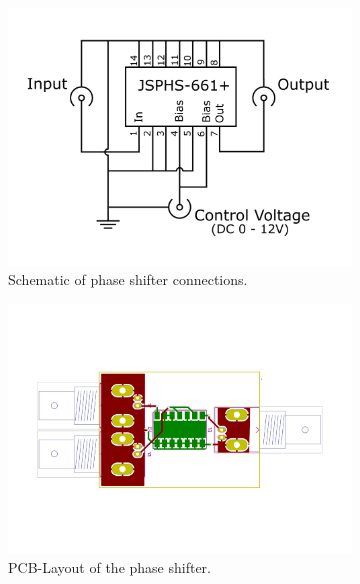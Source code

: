 \begin{description}
\end{description}

\begin{figure}[ht]
	\centering
	\begin{subfigure}{0.4\textwidth}
		\centering
		\includegraphics[width=\textwidth]{Chapters/Deflection/circuit_phase4zu3}
		\caption{Schematic of phase shifter connections.}
		\label{fig:circuit_phase}
	\end{subfigure}
	\hspace{0.1\textwidth}
	\begin{subfigure}{0.4\textwidth}
		\centering
		\includegraphics[width=\textwidth]{Chapters/Deflection/PCB_phase3}
		\caption{PCB-Layout of the phase shifter.}
		\label{fig:PCB_phase}
	\end{subfigure}
	\caption{}
	\label{fig:PhaseShifter}
\end{figure}




